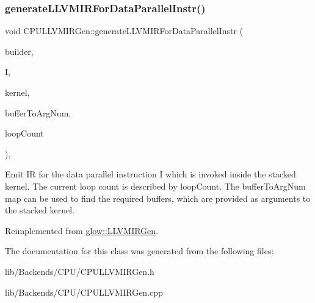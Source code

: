 \subsubsection{\texorpdfstring{generate\+L\+L\+V\+M\+I\+R\+For\+Data\+Parallel\+Instr()}{generateLLVMIRForDataParallelInstr()}}
{\footnotesize\ttfamily void C\+P\+U\+L\+L\+V\+M\+I\+R\+Gen\+::generate\+L\+L\+V\+M\+I\+R\+For\+Data\+Parallel\+Instr (\begin{DoxyParamCaption}\item[{llvm\+::\+I\+R\+Builder$<$$>$ \&}]{builder,  }\item[{const \hyperlink{classglow_1_1_instruction}{glow\+::\+Instruction} $\ast$}]{I,  }\item[{llvm\+::\+Function $\ast$}]{kernel,  }\item[{llvm\+::\+Dense\+Map$<$ \hyperlink{classglow_1_1_value}{Value} $\ast$, int $>$ \&}]{buffer\+To\+Arg\+Num,  }\item[{llvm\+::\+Value $\ast$}]{loop\+Count }\end{DoxyParamCaption})\hspace{0.3cm}{\ttfamily [override]}, {\ttfamily [virtual]}}

Emit IR for the data parallel instruction {\ttfamily I} which is invoked inside the stacked {\ttfamily kernel}. The current loop count is described by {\ttfamily loop\+Count}. The {\ttfamily buffer\+To\+Arg\+Num} map can be used to find the required buffers, which are provided as arguments to the stacked {\ttfamily kernel}. 

Reimplemented from \hyperlink{classglow_1_1_l_l_v_m_i_r_gen_a638e1a6f88ef525a57fa03c7c0cae7cc}{glow\+::\+L\+L\+V\+M\+I\+R\+Gen}.



The documentation for this class was generated from the following files\+:\begin{DoxyCompactItemize}
\item 
lib/\+Backends/\+C\+P\+U/C\+P\+U\+L\+L\+V\+M\+I\+R\+Gen.\+h\item 
lib/\+Backends/\+C\+P\+U/C\+P\+U\+L\+L\+V\+M\+I\+R\+Gen.\+cpp\end{DoxyCompactItemize}

